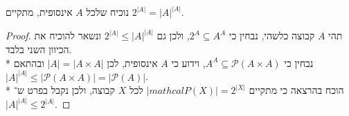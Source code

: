 \Question{}
נוכיח שלכל $A$ אינסופית, מתקיים $2^{|A|} = {|A|}^{|A|}$.
\begin{proof}
	תהי $A$ קבוצה כלשהי, נבחין כי $2^A \subseteq A^A$, ולכן גם $2^{|A|} \le {|A|}^{|A|}$ ונשאר להוכיח את הכיוון השני בלבד. \\*
	נבחין כי $A^A \subseteq \mathcal{P}(A \times A)$, וידוע כי $A$ אינסופית, לכן $|A| = |A \times A|$ ובהתאם ${|A|}^{|{A}|} \le |\mathcal{P}(A \times A)| = |\mathcal{P}(A)|$. \\*
	הוכח בהרצאה כי מתקיים $|mathcal{P}(X)| = 2^{|X|}$ לכל $X$ קבוצה, ולכן נקבל בפרט ש־${|A|}^{|A|} \le 2^{|A|}$.
\end{proof}



